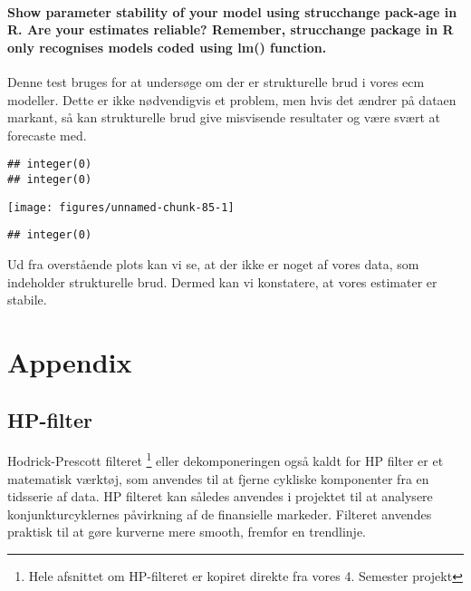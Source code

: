 \documentclass[
  10pt,
]{article}
\begin{document}
\hypertarget{show-parameter-stability-of-your-model-using-strucchange-pack-age-in-r.-are-your-estimates-reliable-remember-strucchange-package-in-r-only-recognises-models-coded-using-lm-function.}{%
\paragraph{Show parameter stability of your model using strucchange
pack-age in R. Are your estimates reliable? Remember, strucchange
package in R only recognises models coded using lm()
function.}\label{show-parameter-stability-of-your-model-using-strucchange-pack-age-in-r.-are-your-estimates-reliable-remember-strucchange-package-in-r-only-recognises-models-coded-using-lm-function.}}

\leavevmode

Denne test bruges for at undersøge om der er strukturelle brud i vores
ecm modeller. Dette er ikke nødvendigvis et problem, men hvis det ændrer
på dataen markant, så kan strukturelle brud give misvisende resultater
og være svært at forecaste med.

\begin{verbatim}
## integer(0)
## integer(0)
\end{verbatim}

\begin{center}\texttt{[image: figures/unnamed-chunk-85-1]} \end{center}

\begin{verbatim}
## integer(0)
\end{verbatim}

Ud fra overstående plots kan vi se, at der ikke er noget af vores data,
som indeholder strukturelle brud. Dermed kan vi konstatere, at vores
estimater er stabile.

\newpage

\hypertarget{appendix}{%
\section{Appendix}\label{appendix}}

\hypertarget{sec:hpfilter}{%
\subsection{HP-filter}\label{sec:hpfilter}}

Hodrick-Prescott filteret
\footnote[1]{Hele afsnittet om HP-filteret er kopiret direkte fra vores 4. Semester projekt}
eller dekomponeringen også kaldt for HP filter er et matematisk værktøj,
som anvendes til at fjerne cykliske komponenter fra en tidsserie af
data. HP filteret kan således anvendes i projektet til at analysere
konjunkturcyklernes påvirkning af de finansielle markeder. Filteret
anvendes praktisk til at gøre kurverne mere smooth, fremfor en
trendlinje.
\end{document}
